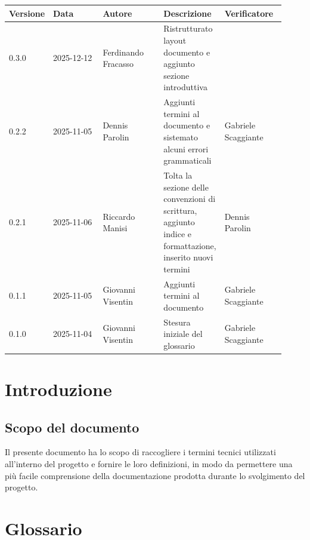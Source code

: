 \documentclass[a4paper,12pt]{article}
\begin{document}
\begin{center}
\small
\renewcommand{\arraystretch}{1.2} 
\begin{tabular}{|p{0.1\linewidth}|p{0.18\linewidth}|p{0.22\linewidth}|p{0.20\linewidth}|p{0.22\linewidth}|}
\hline
\rowcolor{gray!60} 
\textbf{Versione} & \textbf{Data} & \textbf{Autore} & \textbf{Descrizione} & \textbf{Verificatore} \\
\hline
\rowcolor{gray!20}
0.3.0 & 2025-12-12 & Ferdinando Fracasso & Ristrutturato layout documento e aggiunto sezione introduttiva & \\
\hline
\rowcolor{white}
0.2.2 & 2025-11-05 & Dennis Parolin & Aggiunti termini al documento e sistemato alcuni errori grammaticali & Gabriele Scaggiante \\
\hline
\rowcolor{gray!20}
0.2.1 & 2025-11-06 & Riccardo Manisi & Tolta la sezione delle convenzioni di scrittura, aggiunto indice e formattazione, inserito nuovi termini & Dennis Parolin \\
\hline
\rowcolor{white}
0.1.1 & 2025-11-05 & Giovanni Visentin & Aggiunti termini al documento & Gabriele Scaggiante \\
\hline
\rowcolor{gray!20}
0.1.0 & 2025-11-04 & Giovanni Visentin & Stesura iniziale del glossario & Gabriele Scaggiante \\
\hline
\end{tabular}
\end{center}


\clearpage

\clearpage
\tableofcontents
\thispagestyle{empty} %
\clearpage

\clearpage
\section{Introduzione}
\subsection*{Scopo del documento}
Il presente documento ha lo scopo di raccogliere i termini tecnici utilizzati all'interno del progetto e fornire le loro definizioni, in modo da permettere una più facile comprensione della documentazione prodotta durante lo svolgimento del progetto.

\clearpage
\section*{Glossario}
\end{document}
